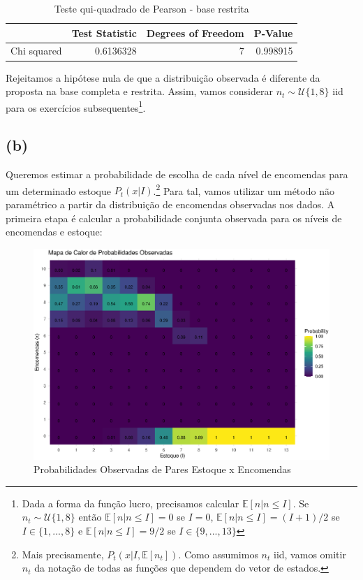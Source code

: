 \documentclass{article}
\begin{document}
\begin{table}[H]
    \centering
\begin{tabular}{l|r|r|r}
\hline
  & Test Statistic & Degrees of Freedom & P-Value\\
\hline
Chi squared & 0.6136328 & 7 & 0.998915\\
\hline
\end{tabular}
    \caption{Teste qui-quadrado de Pearson - base restrita}
    \label{tab:gof2}
\end{table}


Rejeitamos a hipótese nula de que a distribuição observada é diferente da proposta na base completa e restrita. Assim, vamos considerar $n_t \sim \mathcal{U}\{1,8\}$ iid para os exercícios subsequentes\footnote{Dada a forma da função lucro, precisamos calcular $\mathbb{E}[n | n \leq I]$. Se $n_t \sim \mathcal{U}\{1,8\}$ então $\mathbb{E}[n | n \leq I] = 0$ se $I=0$, $\mathbb{E}[n | n \leq I] = (I+1)/2$ se $I \in \{1,..., 8\}$ e $\mathbb{E}[n | n \leq I] = 9/2$ se $I \in \{9, ..., 13\}$}.

\subsection*{(b)}%

Queremos estimar a probabilidade de escolha de cada nível de encomendas para um determinado estoque $P_t (x | I)$.\footnote{Mais precisamente, $P_t (x | I, \mathbb{E}[n_t])$. Como assumimos $n_t$ iid, vamos omitir $n_t$ da notação de todas as funções que dependem do vetor de estados.} Para tal, vamos utilizar um método não paramétrico a partir da distribuição de encomendas observadas nos dados. A primeira etapa é calcular a probabilidade conjunta observada para os níveis de encomendas e estoque:

\begin{figure}[H]
    \centering
    \includegraphics[width=\textwidth]{figs and tabs/prob_mat_xt_it.eps}
    \caption{Probabilidades Observadas de Pares Estoque x Encomendas}
    \label{fig:enter-label}
\end{figure}
\end{document}
